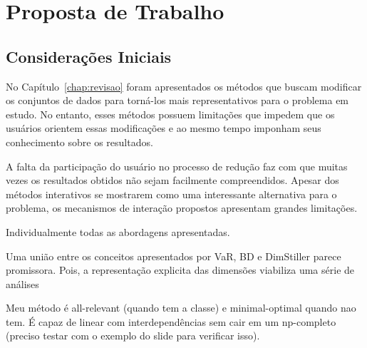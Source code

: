 \chapter{Proposta de Trabalho}\label{chap:proposta}

\section{Considerações Iniciais}

No Capítulo~\ref{chap:revisao} foram apresentados os
métodos que buscam modificar os conjuntos de dados para 
torná-los mais representativos para o problema em estudo. No
entanto, esses métodos possuem limitações que impedem que os
usuários orientem essas modificações e ao mesmo tempo
imponham seus conhecimento sobre os resultados.

A falta da participação do usuário no processo de redução faz com que muitas vezes os resultados obtidos não sejam facilmente compreendidos. Apesar dos métodos interativos se mostrarem como uma interessante alternativa para o problema, os mecanismos de interação propostos apresentam grandes limitações. 





Individualmente todas as abordagens apresentadas.





Uma união entre os conceitos apresentados por VaR, BD e          DimStiller parece promissora. Pois, a representação explicita    das dimensões viabiliza uma série de análises

Meu método é all-relevant (quando tem a classe) e minimal-optimal quando nao tem. É capaz de linear com interdependências sem cair em um np-completo (preciso testar com o exemplo do slide para verificar isso).

